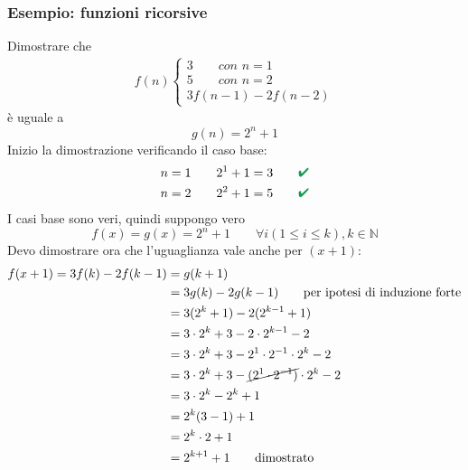 \documentclass[italian]{article}
\renewcommand{\checkmark}{\textcolor{ForestGreen}{\text{$\qquad$\ding{52}}}}
\begin{document}
\subsubsection{Esempio: funzioni ricorsive}
Dimostrare che 
\begin{gather*}
	f(n)
	\begin{cases*}
		3 \qquad \textit{con } n=1 \\
		5 \qquad \textit{con } n=2 \\
		3f(n-1)-2f(n-2)
	\end{cases*}
\end{gather*}
è uguale a 
\[
	g(n) = 2^n + 1
\]
Inizio la dimostrazione verificando il caso base:
\begin{gather*}
	n=1 \qquad 2^1 + 1 = 3 \checkmark \\
	n=2 \qquad 2^2 + 1 = 5 \checkmark
\end{gather*}
I casi base sono veri, quindi suppongo vero
\[
	f(x) = g(x) = 2^n + 1 \qquad \forall i(1\leq i\leq k), k\in \mathbb{N}
\]
Devo dimostrare ora che l'uguaglianza vale anche per $(x+1)$:
\begin{gather*}
	\begin{split}
		f(x+1) = 3f(k)-2f(k-1) &= g(k+1)\\
		&= 3g(k) - 2g(k-1) \qquad \text{per ipotesi di induzione forte} \\
		&= 3(2^k+1)-2(2^{k-1}+1) \\
		&= 3\cdot 2^k + 3 -2\cdot 2^{k-1} - 2 \\
		&= 3\cdot 2^k + 3 - 2^1 \cdot 2^{-1}\cdot 2^k -2 \\
		&= 3\cdot 2^k + 3 - \cancel{(2^1 \cdot 2^{-1})}\cdot 2^k -2 \\
		&= 3\cdot 2^k - 2^k +1 \\
		&= 2^k(3-1) + 1 \\
		&= 2^k\cdot 2 + 1 \\
		&= 2^{k+1}+ 1	\qquad \text{dimostrato}
	\end{split}
\end{gather*}

\newpage
\end{document}
